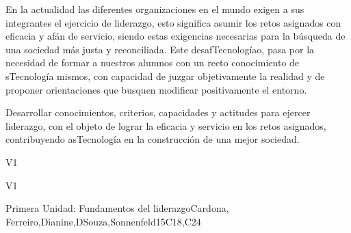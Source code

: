 \begin{syllabus}


\begin{justification}
En la actualidad las diferentes organizaciones en el mundo exigen a sus integrantes el ejercicio de liderazgo, esto significa asumir los retos asignados con eficacia y afán de servicio, siendo estas exigencias necesarias para la búsqueda de una sociedad más justa y reconciliada. 
Este desafTecnologíao, pasa por la necesidad de formar a nuestros alumnos con un recto conocimiento de sTecnología mismos, con capacidad de juzgar objetivamente la realidad y de proponer  orientaciones que busquen modificar positivamente el entorno.  \end{justification}

\begin{goals}
\item Desarrollar conocimientos, criterios, capacidades y actitudes para ejercer liderazgo, con el objeto de lograr la eficacia y servicio en los retos asignados, contribuyendo asTecnología en la construcción de una mejor sociedad.
\end{goals}

\begin{outcomes}{V1}
    \item {}
    \item {}
    \item {}
\end{outcomes}

\begin{competences}{V1}
    \item {}
    \item {}
    \item {}
\end{competences}

\begin{unit}{}{Primera Unidad: Fundamentos del liderazgo}{Cardona, Ferreiro,Dianine,DSouza,Sonnenfeld}{15}{C18,C24}
\begin{topics}
	

\end{topics}
\end{unit}
\end{syllabus}
